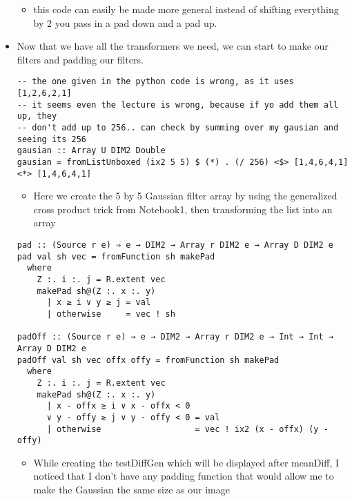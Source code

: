 \documentclass{article}
\begin{document}
\begin{itemize}
\begin{itemize}
\item this code can easily be made more general instead of shifting
everything by 2 you pass in a pad down and a pad up.
\end{itemize}

\item Now that we have all the transformers we need, we can start to make
our filters and padding our filters.
\begin{verbatim}
-- the one given in the python code is wrong, as it uses [1,2,6,2,1]
-- it seems even the lecture is wrong, because if yo add them all up, they
-- don't add up to 256.. can check by summing over my gausian and seeing its 256
gausian :: Array U DIM2 Double
gausian = fromListUnboxed (ix2 5 5) $ (*) . (/ 256) <$> [1,4,6,4,1] <*> [1,4,6,4,1]
\end{verbatim}
\begin{itemize}
\item Here we create the 5 by 5 Gaussian filter array by using the
generalized cross product trick from Notebook1, then transforming
the list into an array
\end{itemize}
\begin{verbatim}
pad :: (Source r e) ⇒ e → DIM2 → Array r DIM2 e → Array D DIM2 e
pad val sh vec = fromFunction sh makePad
  where
    Z :. i :. j = R.extent vec
    makePad sh@(Z :. x :. y)
      | x ≥ i ∨ y ≥ j = val
      | otherwise     = vec ! sh

padOff :: (Source r e) ⇒ e → DIM2 → Array r DIM2 e → Int → Int → Array D DIM2 e
padOff val sh vec offx offy = fromFunction sh makePad
  where
    Z :. i :. j = R.extent vec
    makePad sh@(Z :. x :. y)
      | x - offx ≥ i ∨ x - offx < 0
      ∨ y - offy ≥ j ∨ y - offy < 0 = val
      | otherwise                   = vec ! ix2 (x - offx) (y - offy)
\end{verbatim}
\begin{itemize}
\item While creating the testDiffGen which will be displayed after meanDiff, I
noticed that Ι don't have any padding function that would allow me
to make the Gaussian the same size as our image


\end{itemize}
\end{itemize}
\end{document}
